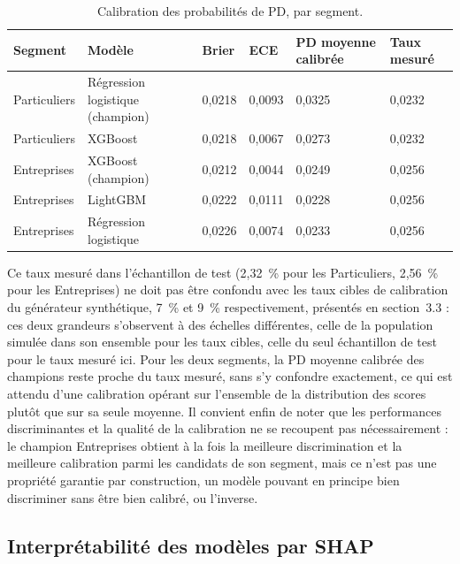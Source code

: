 \begin{table}[htbp]
    \centering
    \footnotesize
    \caption{Calibration des probabilités de PD, par segment.}
    \label{tab:calibration-pd}
    \begin{tabular}{p{2.4cm}p{3.6cm}p{1.6cm}p{1.6cm}p{2cm}p{1.8cm}}
        \toprule
        \textbf{Segment} & \textbf{Modèle} & \textbf{Brier} & \textbf{ECE} & \textbf{PD moyenne calibrée} & \textbf{Taux mesuré} \\
        \midrule
        Particuliers & Régression logistique (champion) & 0,0218 & 0,0093 & 0,0325 & 0,0232 \\
        Particuliers & XGBoost & 0,0218 & 0,0067 & 0,0273 & 0,0232 \\
        \addlinespace
        Entreprises & XGBoost (champion) & 0,0212 & 0,0044 & 0,0249 & 0,0256 \\
        Entreprises & LightGBM & 0,0222 & 0,0111 & 0,0228 & 0,0256 \\
        Entreprises & Régression logistique & 0,0226 & 0,0074 & 0,0233 & 0,0256 \\
        \bottomrule
    \end{tabular}
\end{table}

Ce taux mesuré dans l'échantillon de test (2,32~\% pour les Particuliers, 2,56~\% pour les Entreprises) ne doit pas être confondu avec les taux cibles de calibration du générateur synthétique, 7~\% et 9~\% respectivement, présentés en section~3.3 : ces deux grandeurs s'observent à des échelles différentes, celle de la population simulée dans son ensemble pour les taux cibles, celle du seul échantillon de test pour le taux mesuré ici. Pour les deux segments, la PD moyenne calibrée des champions reste proche du taux mesuré, sans s'y confondre exactement, ce qui est attendu d'une calibration opérant sur l'ensemble de la distribution des scores plutôt que sur sa seule moyenne. Il convient enfin de noter que les performances discriminantes et la qualité de la calibration ne se recoupent pas nécessairement : le champion Entreprises obtient à la fois la meilleure discrimination et la meilleure calibration parmi les candidats de son segment, mais ce n'est pas une propriété garantie par construction, un modèle pouvant en principe bien discriminer sans être bien calibré, ou l'inverse.

\subsection{Interprétabilité des modèles par SHAP}

